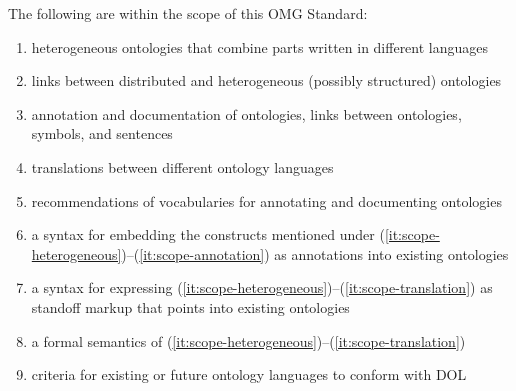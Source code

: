 \documentclass[%
\ifpretendfinal
final%
\else
draft%
\fi,
a4paper,
wd]{isov2}
\newcommand*{\IS}{OMG Standard\xspace}
\begin{document}
\begin{introduction}
The following are within the scope of this \IS:
\begin{enumerate}
\item\label{it:scope-heterogeneous} heterogeneous ontologies that combine parts written in different languages
\item links between distributed and heterogeneous (possibly structured) ontologies
\item\label{it:scope-annotation} annotation and documentation of ontologies, links between ontologies, symbols,
and sentences
\item \label{it:scope-translation} translations between different ontology languages
\item recommendations of vocabularies for annotating and documenting ontologies
\item a syntax for embedding the constructs mentioned under (\ref{it:scope-heterogeneous})–(\ref{it:scope-annotation}) as annotations into existing ontologies
\item a syntax for expressing (\ref{it:scope-heterogeneous})–(\ref{it:scope-translation}) as standoff markup that points into existing ontologies
\item a formal semantics of (\ref{it:scope-heterogeneous})–(\ref{it:scope-translation})
\item criteria for existing or future ontology languages to conform with DOL
\end{enumerate}



\end{introduction}
\end{document}
